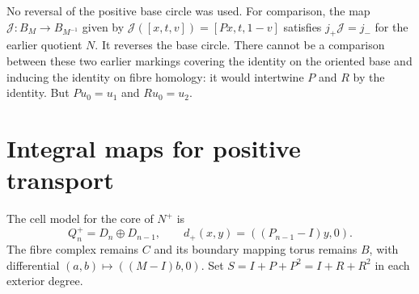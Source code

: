 No reversal of the positive base circle was used. For comparison,
the map $\mathcal J:B_M\to B_{M^{-1}}$ given by
$\mathcal J([x,t,v])=[Px,t,1-v]$ satisfies
$j_+\mathcal J=j_-$ for the earlier quotient $N$. It reverses the
base circle. There cannot be a comparison between these two earlier
markings covering the identity on the oriented base and inducing
the identity on fibre homology: it would intertwine $P$ and $R$
by the identity. But $Pu_0=u_1$ and $Ru_0=u_2$.

\section{Integral maps for positive transport}

The cell model for the core of $N^+$ is
\begin{equation}\label{marked-local:eq:Q-positive}
 Q^+_n=D_n\oplus D_{n-1},\qquad
 d_+(x,y)=((P_{n-1}-I)y,0).
\end{equation}
The fibre complex remains $C$ and its boundary mapping torus remains
$B$, with differential $(a,b)\mapsto((M-I)b,0)$.
Set $S=I+P+P^2=I+R+R^2$ in each exterior degree.

